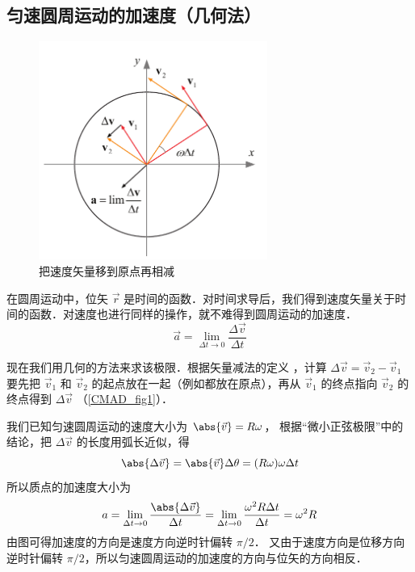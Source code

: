 

\subsection{匀速圆周运动的加速度（几何法）}

\begin{figure}[ht]
\centering
\includegraphics[width=7.5cm]{./figures/CMAD1.pdf}
\caption{把速度矢量移到原点再相减}\label{CMAD_fig1}
\end{figure}

在圆周运动中，位矢 $\vec r$ 是时间的函数．对时间求导后，我们得到速度矢量关于时间的函数．对速度也进行同样的操作，就不难得到圆周运动的加速度．
\begin{equation}
\vec a = \lim_{\Delta t \to 0} \frac{\Delta \vec v}{\Delta t}
\end{equation}

现在我们用几何的方法来求该极限．根据矢量减法的定义%
，计算 $\Delta \vec v = \vec v_2 - \vec v_1$ 要先把 $\vec v_1$ 和 $\vec v_2$ 的起点放在一起（例如都放在原点），再从 $\vec v_1$ 的终点指向 $\vec v_2$ 的终点得到 $\Delta \vec v$ （\autoref{CMAD_fig1}）． 

我们已知匀速圆周运动的速度大小为 $\abs{\vec v} = R\omega$， 根据“微小正弦极限”中的结论，把 $\Delta\vec v$ 的长度用弧长近似，得
\begin{equation}
\abs{\Delta \vec v} = \abs{\vec v}\Delta \theta  = (R\omega)\omega \Delta t
\end{equation}
所以质点的加速度大小为
\begin{equation}
a =\lim_{\Delta t \to 0} \frac{\abs{\Delta \vec v}}{\Delta t} =  \lim_{\Delta t \to 0} \frac{\omega ^2 R \Delta t}{\Delta t} = \omega ^2 R
\end{equation}
由图可得加速度的方向是速度方向逆时针偏转 $\pi/2$． 又由于速度方向是位移方向逆时针偏转 $\pi/2$，所以匀速圆周运动的加速度的方向与位矢的方向相反．

